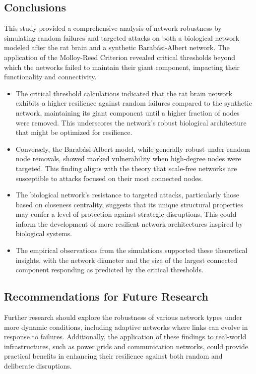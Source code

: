 \documentclass[
	report, %
	11pt, %
]{CSUniSchoolLabReport}
\newcounter{ct}
\begin{document}
\subsection{Conclusions}
This study provided a comprehensive analysis of network robustness by simulating random failures and targeted attacks on both a biological network modeled after the rat brain and a synthetic Barabási-Albert network. The application of the Molloy-Reed Criterion revealed critical thresholds beyond which the networks failed to maintain their giant component,  impacting their functionality and connectivity.\par
\begin{itemize}
    \item The critical threshold calculations indicated that the rat brain network exhibits a higher resilience against random failures compared to the synthetic network, maintaining its giant component until a higher fraction of nodes were removed. This underscores the network's robust biological architecture that might be optimized for resilience.
    \item Conversely, the Barabási-Albert model, while generally robust under random node removals, showed marked vulnerability when high-degree nodes were targeted. This finding aligns with the theory that scale-free networks are susceptible to attacks focused on their most connected nodes.
    \item The biological network's resistance to targeted attacks, particularly those based on closeness centrality, suggests that its unique structural properties may confer a level of protection against strategic disruptions. This could inform the development of more resilient network architectures inspired by biological systems.
    \item The empirical observations from the simulations supported these theoretical insights, with the network diameter and the size of the largest connected component responding as predicted by the critical thresholds.
\end{itemize}

\subsection{Recommendations for Future Research}
Further research should explore the robustness of various network types under more dynamic conditions, including adaptive networks where links can evolve in response to failures. Additionally, the application of these findings to real-world infrastructures, such as power grids and communication networks, could provide practical benefits in enhancing their resilience against both random and deliberate disruptions.
\end{document}

